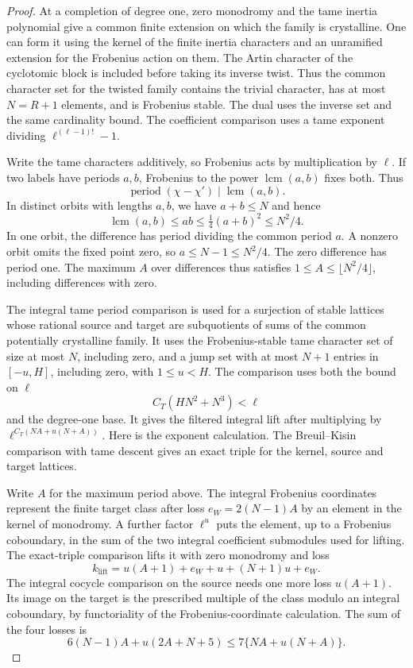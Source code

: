 \begin{proof}
At a completion of degree one, zero monodromy and
the tame inertia polynomial give a common finite
extension on which the family is crystalline.
One can form it using the kernel of the finite
inertia characters and an unramified extension for
the Frobenius action on them. The Artin character
of the cyclotomic block is included before taking
its inverse twist. Thus the common character set
for the twisted family contains the trivial
character, has at most \(N=R+1\) elements, and
is Frobenius stable. The dual uses the inverse
set and the same cardinality bound. The
coefficient comparison uses a tame exponent
dividing \(\ell^{(\ell-1)!}-1\).

Write the tame characters additively, so Frobenius
acts by multiplication by \(\ell\). If two labels have periods \(a,b\), Frobenius to the power \(\operatorname{lcm}(a,b)\) fixes both. Thus
\[
 \operatorname{period}(\chi-\chi')\mid\operatorname{lcm}(a,b).
\]
In distinct orbits with
lengths \(a,b\), we have \(a+b\le N\) and hence
\[
 \operatorname{lcm}(a,b)\le ab\le\tfrac14(a+b)^2\le N^2/4.
\]
In one orbit, the difference has period dividing
the common period \(a\). A nonzero orbit omits the
fixed point zero, so \(a\le N-1\le N^2/4\).
The zero difference has period one. The maximum \(A\)
over differences thus satisfies \(1\le A\le
\lfloor N^2/4\rfloor\), including differences with
zero.

The integral tame period comparison is used for a
surjection of stable lattices whose rational source
and target are subquotients of sums of the common
potentially crystalline family. It uses the
Frobenius-stable tame character set of size at most
\(N\), including zero, and a jump set with at most
\(N+1\) entries in \([-u,H]\), including zero,
with \(1\le u<H\).
The comparison uses both the bound on \(\ell\)
\[
                  C_T(HN^2+N^3)<\ell
\]
and the degree-one base. It gives the filtered
integral lift after multiplying by
\(\ell^{C_T(NA+u(N+A))}\). Here is the exponent
calculation. The Breuil--Kisin comparison with tame
descent gives an exact triple for the kernel,
source and target lattices.

Write \(A\) for the
maximum period above. The integral Frobenius
coordinates represent the finite target class
after loss \(e_W=2(N-1)A\) by an element in the
kernel of monodromy. A further factor \(\ell^u\)
puts the element, up to a Frobenius coboundary,
in the sum of the two integral coefficient
submodules used for lifting. The exact-triple
comparison lifts it with zero monodromy and loss
\[
             k_{\mathrm{lift}}
               =u(A+1)+e_W+u+(N+1)u+e_W .
\]
The integral cocycle comparison on the source
needs one more loss \(u(A+1)\). Its image on the
target is the prescribed multiple of the class
modulo an integral coboundary, by functoriality
of the Frobenius-coordinate calculation.
The sum of the four losses is
\[
                   6(N-1)A+u(2A+N+5)
                   \le 7\{NA+u(N+A)\}.
\]


\end{proof}
